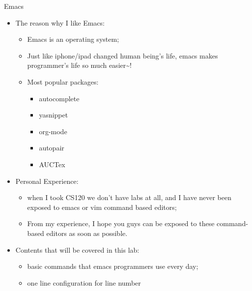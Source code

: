 \documentclass[presentation]{beamer}
\begin{document}
\begin{frame}[label=sec-5]{Emacs}
\begin{itemize}
\item The reason why I like Emacs:
\begin{itemize}
\item Emacs is an \alert{operating system};
\item Just like iphone/ipad changed human being's life, emacs \alert{makes programmer's life so much easier\textasciitilde{}!}
\item Most popular packages: 
\begin{itemize}
\item \alert{autocomplete}
\item \alert{yasnippet}
\item \alert{org-mode}
\item autopair
\item AUCTex
\end{itemize}
\end{itemize}
\item Personal Experience:
\begin{itemize}
\item when I took CS120 we don't have labs at all, and I have never been exposed to \alert{emacs} or \alert{vim} command based editors;
\item From my experience, I hope you guys can be exposed to these command-based editors \alert{as soon as possible}.
\end{itemize}
\item Contents that will be covered in this lab:
\begin{itemize}
\item \alert{basic commands} that emacs programmers use every day;
\item one line \alert{configuration} for line number
\end{itemize}
\end{itemize}
\end{frame}
\end{document}
